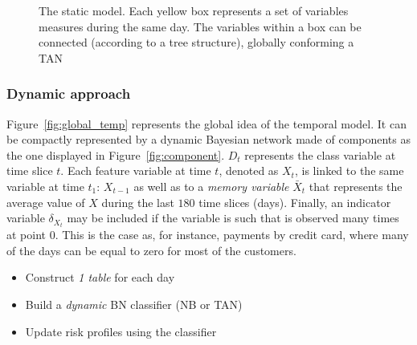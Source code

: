 \begin{figure}[ht]
\begin{center}
\end{center}
\caption{The static model. Each yellow box represents a set of variables measures during the same day.
The variables within a box can be connected (according to a tree structure), globally conforming a TAN}
\label{fig:static}
\end{figure}


\subsubsection*{Dynamic approach} 


Figure~\ref{fig:global_temp} represents the global idea of the temporal model. It can be compactly
represented by a dynamic Bayesian network made of components as the one displayed in 
Figure~\ref{fig:component}. $D_t$ represents the class variable at time slice $t$. Each feature
variable at time $t$, denoted as $X_t$, is linked to the same variable at time $t_1$: $X_{t-1}$
as well as to a \emph{memory variable} $\bar{X}_t$ that represents the average value of $X$
during the last $180$ time slices (days). Finally, an indicator variable $\delta_{X_t}$ may
be included if the variable is such that is observed many times at point 0. This is the case as,
for instance, payments by credit card, where many of the days can be equal to zero for most of
the customers.

\begin{itemize}
\item Construct \emph{1 table} for each day
\item Build a \emph{dynamic} BN classifier (NB or TAN)
\item Update risk profiles using the classifier
\end{itemize}


